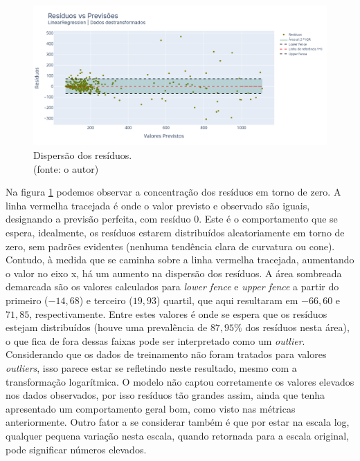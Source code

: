 \begin{figure}[!h]
	\centering
	\includegraphics[scale=0.33]{Figuras/jequiti/resultados/LR_WFV_LOG_RESID_x_PREV.png}
	\caption{Dispersão dos resíduos.\\(fonte: o autor)}
	\label{fig:jequiti_LR_WFV_LOG_RESID_x_PREV}
\end{figure}

Na figura \ref{fig:jequiti_LR_WFV_LOG_RESID_x_PREV} podemos observar a concentração dos resíduos em torno de zero. A linha vermelha tracejada é onde o valor previsto e observado são iguais, designando a previsão perfeita, com resíduo $0$. Este é o comportamento que se espera, idealmente, os resíduos estarem distribuídos aleatoriamente em torno de zero, sem padrões evidentes (nenhuma tendência clara de curvatura ou cone). Contudo, à medida que se caminha sobre a linha vermelha tracejada, aumentando o valor no eixo x, há um aumento na dispersão dos resíduos. A área sombreada demarcada são os valores calculados para \textit{lower fence} e \textit{upper fence} a partir do primeiro ($-14,68$) e terceiro ($19,93$) quartil, que aqui resultaram em $-66,60$ e $71,85$, respectivamente. Entre estes valores é onde se espera que os resíduos estejam distribuídos (houve uma prevalência de $87,95\%$ dos resíduos nesta área), o que fica de fora dessas faixas pode ser interpretado como um \textit{outlier}. Considerando que os dados de treinamento não foram tratados para valores \textit{outliers}, isso parece estar se refletindo neste resultado, mesmo com a transformação logarítmica. O modelo não captou corretamente os valores elevados nos dados observados, por isso resíduos tão grandes assim, ainda que tenha apresentado um comportamento geral bom, como visto nas métricas anteriormente. Outro fator a se considerar também é que por estar na escala log, qualquer pequena variação nesta escala, quando retornada para a escala original, pode significar números elevados.

